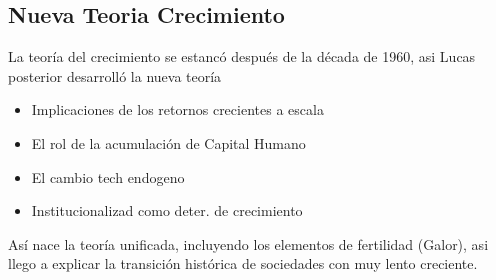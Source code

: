 \subsection{Nueva Teoria Crecimiento}

La teoría del crecimiento se estancó después de la década de 1960, asi Lucas posterior desarrolló la nueva teoría
\begin{itemize}
    \item Implicaciones de los retornos crecientes a escala
    \item El rol de la acumulación de Capital Humano
    \item El cambio tech endogeno
    \item Institucionalizad como deter. de crecimiento
\end{itemize}

Así nace la teoría unificada, incluyendo los elementos de fertilidad (Galor), asi llego a explicar la transición histórica de sociedades con muy lento creciente.

